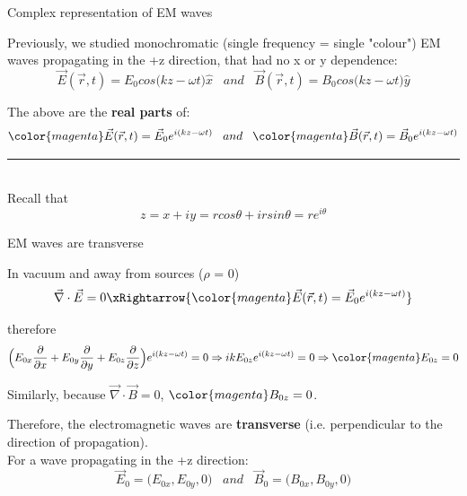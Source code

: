 %
%
%

\begin{frame}{Complex representation of EM waves}

Previously, we studied monochromatic
(single frequency = single "colour") EM waves propagating in the +z
direction, that had no x or y dependence:
\begin{equation*}
    \vec{E}(\vec{r},t) = E_0 cos\Big(kz-\omega t \Big) \hat{x} \;\;\; and \;\;\;
    \vec{B}(\vec{r},t) = B_0 cos\Big(kz-\omega t \Big) \hat{y}
\end{equation*}


The above are the {\bf real parts} of:
\begin{equation*}
    {\color{magenta} \vec{E}(\vec{r},t) = \vec{E}_0  e^{i (kz-\omega t)}  }
    \;\;\; and \;\;\;
    {\color{magenta} \vec{B}(\vec{r},t) = \vec{B}_0  e^{i (kz-\omega t)}  }
\end{equation*}

\noindent\rule{2cm}{0.4pt}\\
{
Recall that
\begin{equation*}
  z = x + i y = r cos\theta + i r sin\theta = r e^{i \theta}
\end{equation*}
}

\end{frame}

%
%
%

\begin{frame}{EM waves are transverse}

In vacuum and away from sources ($\rho$ = 0)
\begin{equation*}
    \vec{\nabla} \cdot \vec{E} = 0
    \xRightarrow{{\color{magenta} \vec{E}(\vec{r},t) = \vec{E}_0  e^{i (kz-\omega t)}  }}
\end{equation*}

therefore
\begin{equation*}
  \Big(
   E_{0x} \frac{\partial }{\partial x} +
   E_{0y} \frac{\partial }{\partial y} +
   E_{0z} \frac{\partial }{\partial z}
  \Big) e^{i (kz-\omega t)} = 0
  \Rightarrow
  i k E_{0z} e^{i (kz-\omega t)} = 0
  \Rightarrow
  {\color{magenta} E_{0z} = 0}
\end{equation*}

\vspace{0.3cm}

Similarly, because $\displaystyle \vec{\nabla} \cdot \vec{B} = 0$,
${\color{magenta} B_{0z} = 0}$.\\

\vspace{0.3cm}

Therefore,
the electromagnetic waves are {\bf transverse}
(i.e. perpendicular to the direction of propagation).\\
\vspace{0.2cm}
For a wave propagating in the +z direction:
\begin{equation*}
    \vec{E}_0 = \Big( E_{0x}, E_{0y}, 0 \Big)   \;\;\; and \;\;\;
    \vec{B}_0 = \Big( B_{0x}, B_{0y}, 0 \Big)
\end{equation*}

\end{frame}

